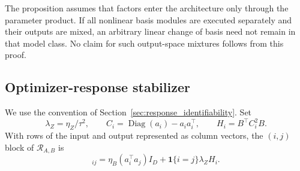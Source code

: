 The proposition assumes that factors enter the architecture only through the
parameter product.  If all nonlinear basis modules are executed separately
and their outputs are mixed, an arbitrary linear change of basis need not
remain in that model class.  No claim for such output-space mixtures follows
from this proof.

\subsection{Optimizer-response stabilizer}
\label{app:response_proofs}

We use the convention of Section~\ref{sec:response_identifiability}.  Set
\begin{equation}
 \lambda_Z=\eta_Z/\tau^2,
 \qquad
 C_i=\operatorname{Diag}(a_i)-a_ia_i^\top,
 \qquad
 H_i=B^\top C_i^2B.
 \label{eq:app_response_notation}
\end{equation}
With rows of the input and output represented as column vectors, the
\((i,j)\) block of \(\mathcal R_{A,B}\) is
\begin{equation}
 [\mathcal R_{A,B}]_{ij}
 =\eta_B(a_i^\top a_j)I_D
  +\mathbf 1\{i=j\}\lambda_ZH_i.
 \label{eq:app_response_blocks}
\end{equation}

